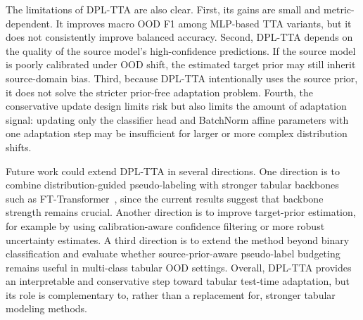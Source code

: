 \documentclass{article}
\begin{document}
The limitations of DPL-TTA are also clear. First, its gains are small and metric-dependent. It improves macro OOD F1 among MLP-based TTA variants, but it does not consistently improve balanced accuracy. Second, DPL-TTA depends on the quality of the source model's high-confidence predictions. If the source model is poorly calibrated under OOD shift, the estimated target prior may still inherit source-domain bias. Third, because DPL-TTA intentionally uses the source prior, it does not solve the stricter prior-free adaptation problem. Fourth, the conservative update design limits risk but also limits the amount of adaptation signal: updating only the classifier head and BatchNorm affine parameters with one adaptation step may be insufficient for larger or more complex distribution shifts.

Future work could extend DPL-TTA in several directions. One direction is to combine distribution-guided pseudo-labeling with stronger tabular backbones such as FT-Transformer~\citep{gorishniy2021revisiting}, since the current results suggest that backbone strength remains crucial. Another direction is to improve target-prior estimation, for example by using calibration-aware confidence filtering or more robust uncertainty estimates. A third direction is to extend the method beyond binary classification and evaluate whether source-prior-aware pseudo-label budgeting remains useful in multi-class tabular OOD settings. Overall, DPL-TTA provides an interpretable and conservative step toward tabular test-time adaptation, but its role is complementary to, rather than a replacement for, stronger tabular modeling methods.


\end{document}
